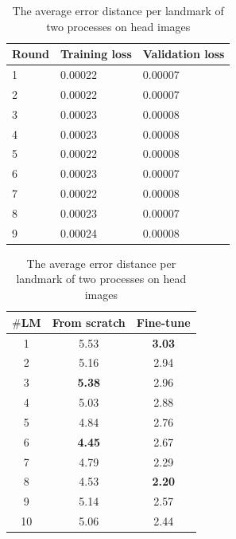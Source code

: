\documentclass[review]{elsarticle}
\begin{document}
\begin{table}[htbp]
\begin{minipage}[t]{0.45\textwidth}
	\centering
	\begin{tabular}{l p{1.5cm} p{1.5cm}}
	Round & Training loss & Validation loss \\ \hline
	1 & 0.00022 & 0.00007  \\ \hline
	2 & 0.00022 & 0.00007 \\ \hline
	3 & 0.00023 & 0.00008 \\ \hline
	4 & 0.00023 & 0.00008 \\ \hline
	5 & 0.00022 & 0.00008 \\ \hline
	6 & 0.00023 & 0.00007 \\ \hline
	7 & 0.00022 & 0.00008 \\ \hline
	8 & 0.00023 & 0.00007 \\ \hline
	9 & 0.00024 & 0.00008 \\ \hline
	\end{tabular}
	\caption{The losses during fine-tuning model on head dataset}
	\label{tblfthead}
\end{minipage}
\hfill
\begin{minipage}[t]{0.45\textwidth}
\centering
\begin{tabular}{|c|c|c|}
\hline
\textbf{$\#$LM} & \textbf{From scratch} & \textbf{Fine-tune} \\ \hline
1 & 5.53 & \textbf{3.03}  \\ \hline
2 & 5.16 & 2.94  \\ \hline
3 & \textbf{5.38}  & 2.96 \\ \hline
4 & 5.03  & 2.88 \\ \hline
5 & 4.84  & 2.76 \\ \hline
6 & \textbf{4.45}  & 2.67 \\ \hline
7 & 4.79  & 2.29 \\ \hline
8 & 4.53  & \textbf{2.20} \\ \hline
9 & 5.14  & 2.57 \\ \hline
10 & 5.06  & 2.44 \\ \hline
\end{tabular}
\caption{The average error distance per landmark of two processes on head images}
\label{tblcmphead}
\end{minipage}
\end{table}
\end{document}

